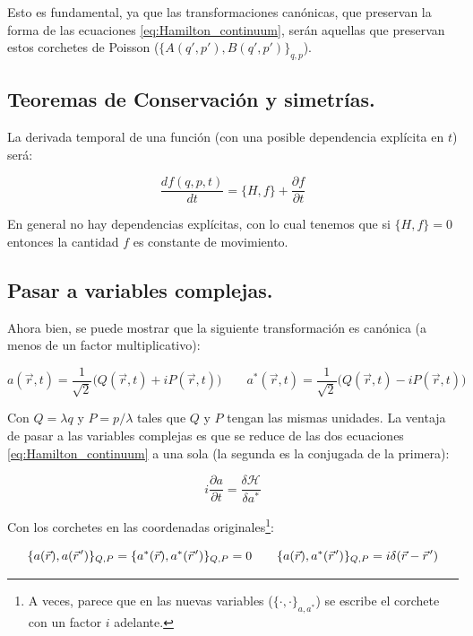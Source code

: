 Esto es fundamental, ya que las transformaciones canónicas, que preservan la forma de las ecuaciones \eqref{eq:Hamilton_continuum}, serán aquellas que preservan estos corchetes de Poisson ($\{A(q',p'), B(q',p')\}_{q,p}$).


\subsection*{Teoremas de Conservación y simetrías.}
La derivada temporal de una función (con una posible dependencia explícita en $t$) será:

\begin{equation}
	\frac{df(q,p,t)}{dt} = \{H, f\} + \frac{\partial f}{\partial t}
\end{equation}

En general no hay dependencias explícitas, con lo cual tenemos que si $\{H, f\}=0$ entonces la cantidad $f$ es constante de movimiento.



\subsection*{Pasar a variables complejas.}
Ahora bien, se puede mostrar que la siguiente transformación es canónica (a menos de un factor multiplicativo):

\begin{equation}
	a(\vec r,t)=\frac{1}{\sqrt{2}}\big(Q(\vec r,t)+iP(\vec r,t)\big) \qquad a^*(\vec r,t)=\frac{1}{\sqrt{2}}\big(Q(\vec r,t)-iP(\vec r,t)\big)
\end{equation}

Con $Q=\lambda q$ y $P=p / \lambda$ tales que $Q$ y $P$ tengan las mismas unidades. La ventaja de pasar a las variables complejas es que se reduce de las dos ecuaciones \eqref{eq:Hamilton_continuum} a una sola (la segunda es la conjugada de la primera):

\begin{equation}
	i\frac{\partial a}{\partial t} = \frac{\delta \mathcal{H}}{\delta a^*}
\end{equation}

Con los corchetes en las coordenadas originales\footnote{A veces, parece que en las nuevas variables ($\{\cdot,\cdot\}_{a,a^*}$) se escribe el corchete con un factor $i$ adelante.}:

\begin{equation}
	\{a(\vec r), a(\pvec r')\}_{Q,P} = \{a^*(\vec r), a^*(\pvec r')\}_{Q,P} = 0 \qquad \{a(\vec r), a^*(\pvec r')\}_{Q,P} = i\delta(\vec r - \pvec r')
\end{equation}

